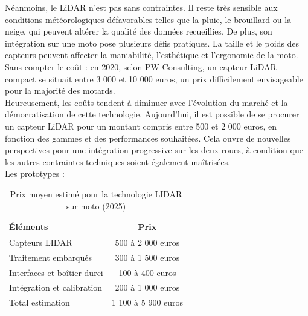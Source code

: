 Néanmoins, le LiDAR n’est pas sans contraintes. Il reste très sensible aux conditions météorologiques défavorables telles que la pluie, le brouillard ou la neige, qui peuvent altérer la qualité des données recueillies. De plus, son intégration sur une moto pose plusieurs défis pratiques. La taille et le poids des capteurs peuvent affecter la maniabilité, l’esthétique et l’ergonomie de la moto. Sans compter le coût : en 2020, selon PW Consulting\cite{marche_capteur_lidar}, un capteur LiDAR compact se situait entre 3 000 et 10 000 euros, un prix difficilement envisageable pour la majorité des motards.\\

Heureusement, les coûts tendent à diminuer avec l’évolution du marché et la démocratisation de cette technologie. Aujourd’hui, il est possible de se procurer un capteur LiDAR pour un montant compris entre 500 et 2 000 euros, en fonction des gammes et des performances souhaitées. Cela ouvre de nouvelles perspectives pour une intégration progressive sur les deux-roues, à condition que les autres contraintes techniques soient également maîtrisées.\\

\vspace{0.5cm}
Les prototypes :\\
\begin{table}[ht]
\centering
\begin{tabular}{|l|c|}
  \hline
  Éléments & Prix \\
  \hline
  Capteurs LIDAR & 500 à 2 000 euros \\
  Traitement embarqués & 300 à 1 500 euros \\
  Interfaces et boîtier durci & 100 à 400 euros \\
  Intégration et calibration & 200 à 1 000 euros \\
  Total estimation & 1 100 à 5 900 euros \\
  \hline
\end{tabular}
\caption{Prix moyen estimé pour la technologie LIDAR sur moto (2025)}
\end{table}

